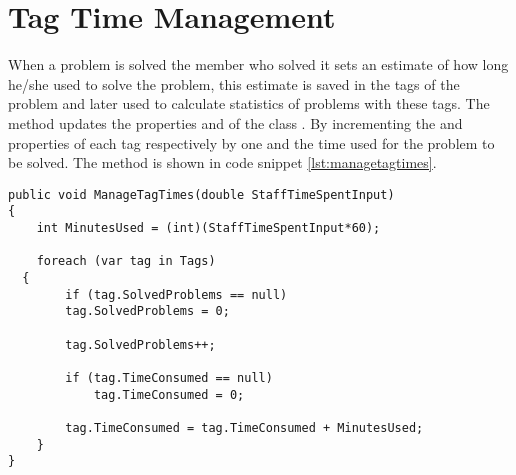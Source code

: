 \section{Tag Time Management}
\label{sec:managetagtimes}


When a problem is solved the \astaff[] member who solved it sets an estimate of how long he/she used to solve the problem, this estimate is saved in the tags of the problem and later used to calculate statistics of problems with these tags. 
The  method updates the properties  and  of the class .
By incrementing the  and  properties of each tag respectively by one and the time used for the problem to be solved.
The method is shown in code snippet \ref{lst:managetagtimes}.




\begin{lstlisting}[style=sourceCode, caption=\myCaption{The \me{ManageTagTimes} method}, label=lst:managetagtimes]
public void ManageTagTimes(double StaffTimeSpentInput)
{
	int MinutesUsed = (int)(StaffTimeSpentInput*60);
	
	foreach (var tag in Tags)
  {
		if (tag.SolvedProblems == null)
		tag.SolvedProblems = 0;
    
		tag.SolvedProblems++;

		if (tag.TimeConsumed == null)
			tag.TimeConsumed = 0;

		tag.TimeConsumed = tag.TimeConsumed + MinutesUsed;
	}
}
\end{lstlisting}